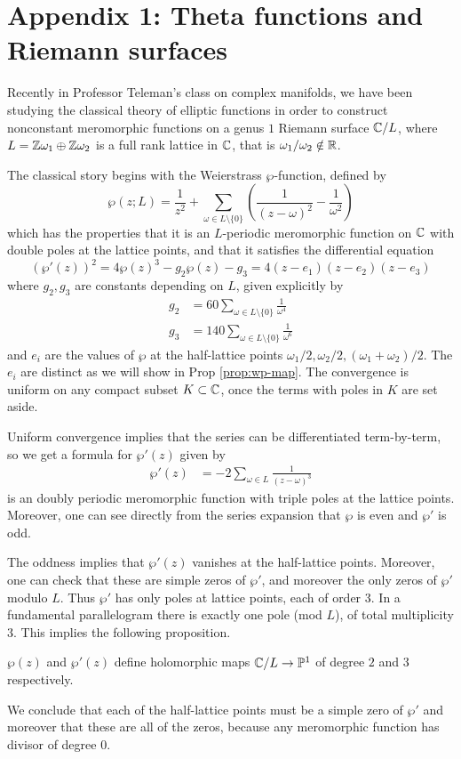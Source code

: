 \documentclass[12pt]{article}
\begin{document}
\section{Appendix 1: Theta functions and Riemann surfaces}
Recently in Professor Teleman's class on complex manifolds, we have been studying the classical theory of elliptic functions in order to construct nonconstant meromorphic functions on a genus $1$ Riemann surface $\mathbb{C}/L$, where $L = \mathbb{Z} \omega_1 \oplus \mathbb{Z} \omega_2$ is a full rank lattice in $\mathbb{C}$, that is $\omega_1/\omega_2 \notin \mathbb{R}$. 

The classical story begins with the Weierstrass $\wp$-function, defined by
\[\wp(z;L) = \frac{1}{z^2} + \sum_{\omega \in L\setminus\{0\}} \left(\frac{1}{(z-\omega)^2} - \frac{1}{\omega^2}\right)\]
which has the properties that it is an $L$-periodic meromorphic function on $\mathbb{C}$ with double poles at the lattice points, and that it satisfies the differential equation
\[(\wp'(z))^2 = 4\wp(z)^3 - g_2\wp(z) - g_3 = 4(z - e_1)(z - e_2)(z - e_3)\]
where $g_2,g_3$ are constants depending on $L$, given explicitly by \begin{align*}
    g_2 & = 60\sum_{\omega \in L\setminus\{0\}} \frac{1}{\omega^4} \\
    g_3 & = 140\sum_{\omega \in L\setminus\{0\}} \frac{1}{\omega^6}
\end{align*} and $e_i$ are the values of $\wp$ at the half-lattice points $\omega_1/2, \omega_2/2, (\omega_1+\omega_2)/2$. The $e_i$ are distinct as we will show in Prop \ref{prop:wp-map}.
The convergence is uniform on any compact subset $K \subset \mathbb{C}$, once the terms with poles in $K$ are set aside.

Uniform convergence implies that the series can be differentiated term-by-term, so we get a formula for $\wp'(z)$ given by \begin{align*}
    \wp'(z) & = -2\sum_{\omega \in L} \frac{1}{(z-\omega)^3}
\end{align*} is an doubly periodic meromorphic function with triple poles at the lattice points. Moreover, one can see directly from the series expansion that $\wp$ is even and $\wp'$ is odd.

The oddness implies that $\wp'(z)$ vanishes at the half-lattice points. Moreover, one can check that these are simple zeros of $\wp'$, and moreover the only zeros of $\wp'$ modulo $L$. Thus $\wp'$ has only poles at lattice points, each of order 3. In a fundamental parallelogram there is exactly one pole (mod $L$), of total multiplicity 3. This implies the following proposition.
\begin{proposition}
    $\wp(z)$ and $\wp'(z)$ define holomorphic maps $\mathbb{C}/L \to \mathbb{P}^1$ of degree $2$ and $3$ respectively.
\end{proposition}
We conclude that each of the half-lattice points must be a simple zero of $\wp'$ and moreover that these are all of the zeros, because any meromorphic function has divisor of degree 0.
\end{document}

